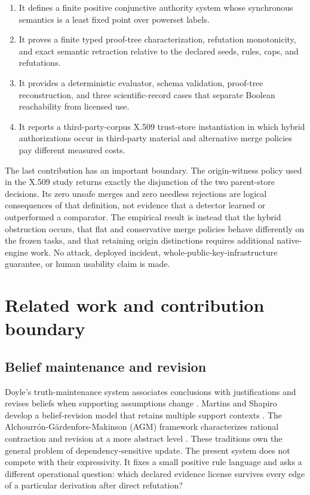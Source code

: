 \documentclass[pdflatex,sn-mathphys-num]{sn-jnl}
\providecommand{\tightlist}{%
  \setlength{\itemsep}{0pt}\setlength{\parskip}{0pt}}
\begin{document}
\begin{enumerate}
\def\labelenumi{\arabic{enumi}.}
\tightlist
\item
  It defines a finite positive conjunctive authority system whose synchronous semantics is a least fixed point over powerset labels.
\item
  It proves a finite typed proof-tree characterization, refutation monotonicity, and exact semantic retraction relative to the declared seeds, rules, caps, and refutations.
\item
  It provides a deterministic evaluator, schema validation, proof-tree reconstruction, and three scientific-record cases that separate Boolean reachability from licensed use.
\item
  It reports a third-party-corpus X.509 trust-store instantiation in which hybrid authorizations occur in third-party material and alternative merge policies pay different measured costs.
\end{enumerate}

The last contribution has an important boundary. The origin-witness policy used in the X.509 study returns exactly the disjunction of the two parent-store decisions. Its zero unsafe merges and zero needless rejections are logical consequences of that definition, not evidence that a detector learned or outperformed a comparator. The empirical result is instead that the hybrid obstruction occurs, that flat and conservative merge policies behave differently on the frozen tasks, and that retaining origin distinctions requires additional native-engine work. No attack, deployed incident, whole-public-key-infrastructure guarantee, or human usability claim is made.

\section{Related work and contribution boundary}\label{related-work-and-contribution-boundary}

\subsection{Belief maintenance and revision}\label{belief-maintenance-and-revision}

Doyle's truth-maintenance system associates conclusions with justifications and revises beliefs when supporting assumptions change \citep{doyle1979}. Martins and Shapiro develop a belief-revision model that retains multiple support contexts \citep{martins1988}. The Alchourrón-Gärdenfors-Makinson (AGM) framework characterizes rational contraction and revision at a more abstract level \citep{agm1985}. These traditions own the general problem of dependency-sensitive update. The present system does not compete with their expressivity. It fixes a small positive rule language and asks a different operational question: which declared evidence license survives every edge of a particular derivation after direct refutation?
\end{document}
